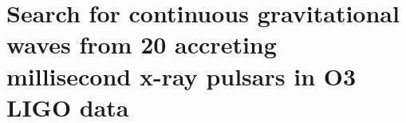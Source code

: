 \documentclass[School=Unimelb]{Dissertate}
\newcommand{\todo}[1]{{\color{red}~\textsf{[{\bf TODO}: #1]}}}
\begin{document}
  \graphicspath{{./figures/}}
  
  \frontmatter

  \linenumbers

  



  \chapter{Search for continuous gravitational waves from 20 accreting millisecond x-ray pulsars in O3 LIGO data}
  \label{chap:amxp}
  

  \clearpage
  \printbibliography
\end{document}
